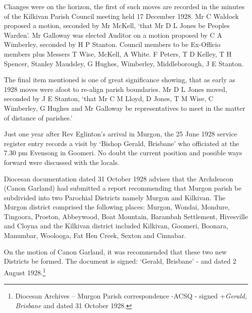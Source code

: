 Changes were on the horizon, the first of such moves are recorded in the minutes of the Kilkivan Parish Council meeting held 17 December 1928. Mr C Waldock proposed a motion, seconded by Mr McKell, `that Mr D L Jones be Peoples Warden'. Mr Galloway was elected Auditor on a motion proposed by C A Wimberley, seconded by H P Stanton. Council members to be Ex-Officio members plus Messers T Wise, McKell, A White. F Peters, T D Kelley, T H Spencer, Stanley Maudsley, G Hughes, Wimberley, Middleborough, J E Stanton.



The final item mentioned is one of great significance showing, that as early as 1928 moves were afoot to re-align parish boundaries. Mr D L Jones moved, seconded by J E Stanton, `that Mr C M Lloyd, D Jones, T M Wise, C Wimberley, G Hughes and Mr Galloway be representatives to meet in the matter of distance of parishes.'



Just one year after Rev Eglinton's arrival in Murgon, the 25 June 1928 service register entry records a visit by `Bishop Gerald, Brisbane' who officiated at the 7.30 pm Evensong in Goomeri. No doubt the current position and possible ways forward were discussed with the locals.



Diocesan documentation dated 31 October 1928 advises that the Archdeacon (Canon Garland) had submitted a report recommending that Murgon parish be subdivided into two Parochial Districts namely Murgon and Kilkivan. The Murgon district comprised the following places: Murgon, Wondai, Mondure, Tingoora, Proston, Abbeywood, Boat Mountain, Barambah Settlement, Hivesville and Cloyna and the Kilkivan district included Kilkivan, Goomeri, Boonara, Manumbar, Woolooga, Fat Hen Creek, Sexton and Cinnabar.



On the motion of Canon Garland, it was recommended that these two new Districts be formed. The document is signed: `Gerald, Brisbane' - and dated 2 August 1928.\footnote{Diocesan Archives -- Murgon Parish correspondence -ACSQ - signed +\emph{Gerald, Brisbane} and dated 31 October 1928.}


